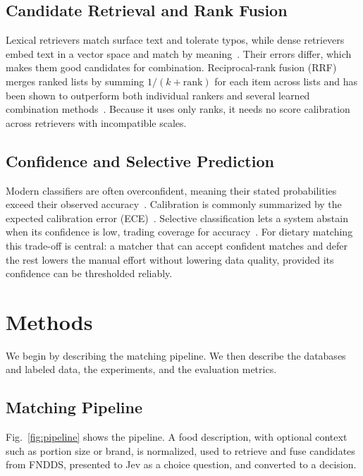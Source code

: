 \documentclass[11pt,journal,onecolumn]{IEEEtran}
\begin{document}
\subsection{Candidate Retrieval and Rank Fusion}
Lexical retrievers match surface text and tolerate typos, while dense retrievers embed text in a vector space and match by meaning~\cite{bge,gte}. Their errors differ, which makes them good candidates for combination. Reciprocal-rank fusion (RRF) merges ranked lists by summing $1/(k+\mathrm{rank})$ for each item across lists and has been shown to outperform both individual rankers and several learned combination methods~\cite{rrf}. Because it uses only ranks, it needs no score calibration across retrievers with incompatible scales.

\subsection{Confidence and Selective Prediction}
Modern classifiers are often overconfident, meaning their stated probabilities exceed their observed accuracy~\cite{guo}. Calibration is commonly summarized by the expected calibration error (ECE)~\cite{naeini}. Selective classification lets a system abstain when its confidence is low, trading coverage for accuracy~\cite{geifman}. For dietary matching this trade-off is central: a matcher that can accept confident matches and defer the rest lowers the manual effort without lowering data quality, provided its confidence can be thresholded reliably.

\section{Methods}
We begin by describing the matching pipeline. We then describe the databases and labeled data, the experiments, and the evaluation metrics.

\subsection{Matching Pipeline}
Fig.~\ref{fig:pipeline} shows the pipeline. A food description, with optional context such as portion size or brand, is normalized, used to retrieve and fuse candidates from FNDDS, presented to Jev as a choice question, and converted to a decision.
\end{document}
